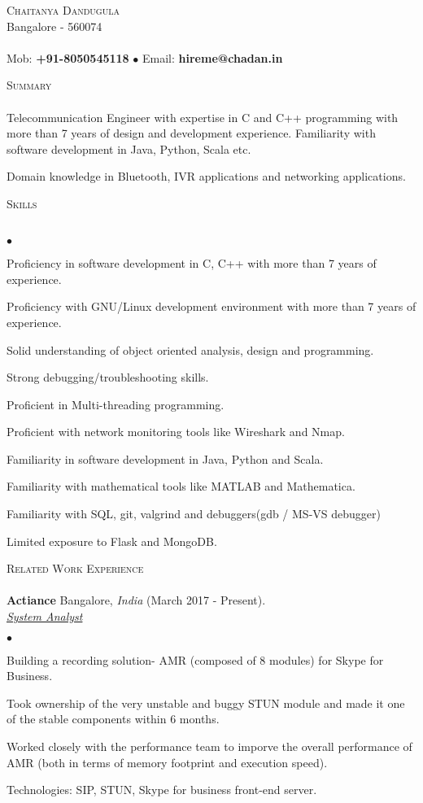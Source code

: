\documentclass[a4paper]{article}
\newcommand{\lineunder}{\vspace*{-8pt} \\ \hspace*{-18pt} \hrulefill \\}
\newcommand{\header}[1]{{\hspace*{-15pt}\vspace*{6pt} \textsc{#1}} \vspace*{-6pt} \lineunder}
\newcommand{\employer}[4]{{ \textbf{#1} #2  (#3).\\ \underline{\emph{#4}}\\  }}
\newcommand{\contact}[3]{
\vspace*{-8pt}
\begin{center}
{\LARGE \scshape {#1}}\\
#2 \lineunder
#3
\end{center}
\vspace*{-8pt}
}
\newenvironment{achievements}{\begin{list}{$\bullet$}{\topsep 0pt \itemsep -2pt}}{\vspace*{4pt}\end{list}}
\begin{document}
\small
\smallskip
\contact{Chaitanya Dandugula}
{Bangalore - 560074}
{Mob: \textbf{+91-8050545118} $\bullet$ Email: \textbf{hireme@chadan.in}}
\vspace*{5pt}

\header{Summary}
Telecommunication Engineer with expertise in C and C++ programming with more than 7 years of design and development experience. Familiarity with software development in Java, Python, Scala etc.

Domain knowledge in Bluetooth, IVR applications and networking applications.

\header{Skills}
\begin{achievements}
\item Proficiency in software development in C, C++ with more than 7 years of experience.
\item Proficiency with GNU/Linux development environment with more than 7 years of experience.
\item Solid understanding of object oriented analysis, design and programming.
\item Strong debugging/troubleshooting skills.
\item Proficient in Multi-threading programming.
\item Proficient with network monitoring tools like Wireshark and Nmap.
\item Familiarity in software development in Java, Python and Scala.
\item Familiarity with mathematical tools like MATLAB and Mathematica.
\item Familiarity with SQL, git, valgrind and debuggers(gdb / MS-VS debugger)
\item Limited exposure to Flask and MongoDB.
\end{achievements}

\header{Related Work Experience}
\employer{Actiance} {Bangalore, \textit{India}} {March 2017 - Present} {System Analyst}
	\begin{achievements}
  \item Building a recording solution- AMR (composed of 8 modules) for Skype for Business.
  \item Took ownership of the very unstable and buggy STUN module and made it one of the stable components within 6 months.
 \item Worked closely with the performance team to imporve the overall performance of AMR (both in terms of memory footprint and execution speed).
  \item Technologies: SIP, STUN, Skype for business front-end server.
	\end{achievements}
\end{document}
